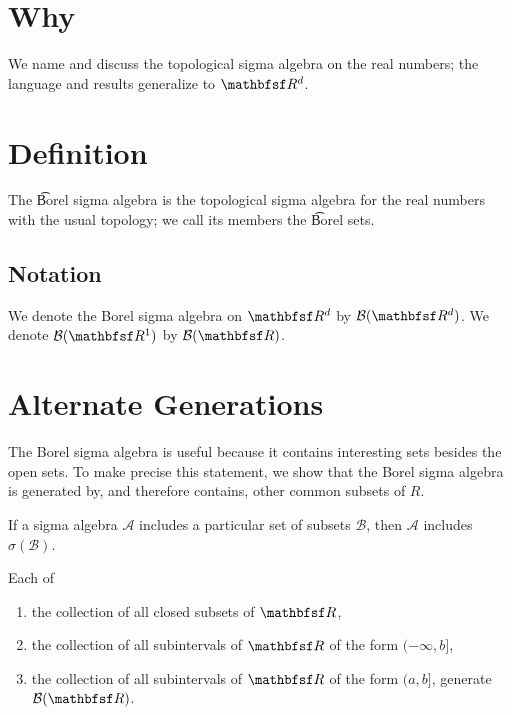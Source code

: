 

\section*{Why}

We name and discuss the topological sigma algebra on the real numbers; the language and results generalize to $\R ^d$.

\section*{Definition}

The \t{Borel sigma algebra} is the topological sigma algebra for the real numbers with the usual topology; we call its members the \t{Borel sets}.

\subsection*{Notation}

We denote the Borel sigma algebra on $\R ^d$ by $\mathcal{B} (\R ^d)$.
We denote $\mathcal{B} (\R ^1)$ by $\mathcal{B} (\R )$.

\section*{Alternate Generations}

The Borel sigma algebra is useful because it contains interesting sets besides the open sets.
To make precise this statement, we show that the Borel sigma algebra is generated by, and therefore contains, other common subsets of $R$.

\begin{proposition}
If a sigma algebra $\mathcal{A} $ includes a particular set of subsets $\mathcal{B} $, then $\mathcal{A} $ includes $\sigma (\mathcal{B} )$.
\end{proposition}

\begin{proposition}

\label{borelalternategenerations}Each of
  \begin{enumerate}
    \item the collection of all closed subsets of $\R$,
    \item the collection of all subintervals of $\R$ of the form $(-\infty, b]$,
    \item the collection of all subintervals of $\R$ of the form $(a, b]$,
generate $\mathcal{B} (\R)$.
  \end{enumerate}
\end{proposition}

